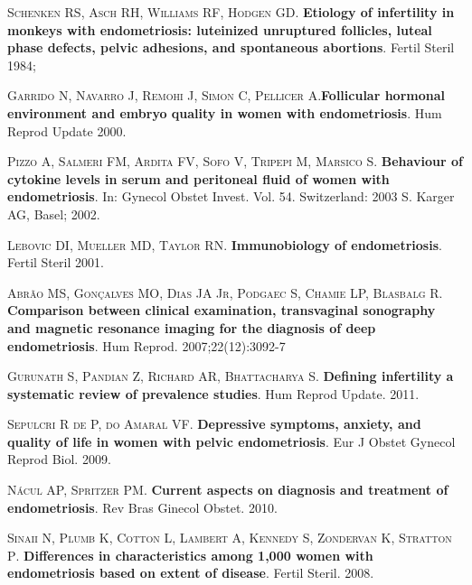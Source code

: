 \documentclass[12pt]{article} %
\begin{document}
\textsc{Schenken RS, Asch RH, Williams RF, Hodgen GD}.\textbf{ Etiology of infertility in
monkeys with endometriosis: luteinized unruptured follicles, luteal phase
defects, pelvic adhesions, and spontaneous abortions}. Fertil Steril 1984;

\vspace{0,5cm}

\textsc{Garrido N, Navarro J, Remohi J, Simon C, Pellicer A}.\textbf{Follicular hormonal
environment and embryo quality in women with endometriosis}. Hum
Reprod Update 2000.

\vspace{0,5cm}

\textsc{Pizzo A, Salmeri FM, Ardita FV, Sofo V, Tripepi M, Marsico S}. \textbf{Behaviour of
cytokine levels in serum and peritoneal fluid of women with endometriosis}.
In: Gynecol Obstet Invest. Vol. 54. Switzerland: 2003 S. Karger AG, Basel;
2002.

\vspace{0,5cm}

\textsc{Lebovic DI, Mueller MD, Taylor RN}.\textbf{ Immunobiology of endometriosis}. Fertil
Steril 2001.

\vspace{0,5cm}

\textsc{Abrão MS, Gonçalves MO, Dias JA Jr, Podgaec S, Chamie LP, Blasbalg R}. \textbf{Comparison between clinical examination, transvaginal sonography and magnetic resonance imaging for the diagnosis of
deep endometriosis}. Hum Reprod. 2007;22(12):3092-7

\vspace{0,5cm}

\textsc{Gurunath S, Pandian Z, Richard AR, Bhattacharya S}. \textbf{Defining infertility a systematic review of prevalence studies}. Hum Reprod Update. 2011.

\vspace{0,5cm}


\textsc{Sepulcri R de P, do Amaral VF}.
\textbf{Depressive symptoms, anxiety, and quality
of life in women with pelvic endometriosis}.
Eur J Obstet Gynecol Reprod Biol.
2009.

\vspace{0,5cm}


\textsc{Nácul AP, Spritzer PM}. \textbf{Current aspects on diagnosis and treatment of
endometriosis}. Rev Bras Ginecol Obstet. 2010.

\vspace{0,5cm}


\textsc{Sinaii N, Plumb K, Cotton L, Lambert A, Kennedy S, Zondervan K, Stratton P}. \textbf{Differences in characteristics among 1,000 women with endometriosis based on extent of disease}. Fertil Steril. 2008.
\end{document}
